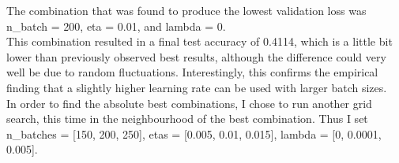 \documentclass[11pt,a4paper]{article}
\begin{document}
The combination that was found to produce the lowest validation loss was n\_batch = 200, eta = 0.01, and lambda = 0.\\

This combination resulted in a final test accuracy of 0.4114, which is a little bit lower than previously observed best results, although the difference could very well be due to random fluctuations. Interestingly, this confirms the empirical finding that a slightly higher learning rate can be used with larger batch sizes.\\

In order to find the absolute best combinations, I chose to run another grid search, this time in the neighbourhood of the best combination. Thus I set n\_batches = [150, 200, 250], etas = [0.005, 0.01, 0.015], lambda = [0, 0.0001, 0.005].\\
\end{document}
